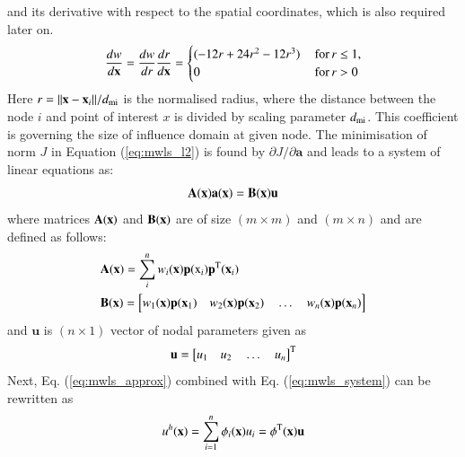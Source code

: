 \documentclass[11pt]{acmeArticle}
\numberwithin{equation}{section}
\begin{document}
and its derivative with respect to the spatial coordinates, which is also required later on.
\begin{equation}
\frac{dw}{d{\boldsymbol {\rm x}}}= \frac{dw}{dr}\frac{dr}{d{\boldsymbol {\rm x}}} =\begin{cases} (-12r +24r^2 -12 r^3) \,  & \mathrm{for} \, r \leq 1, \\ 0 & \mathrm{for} \, r > 0  \end{cases}
\end{equation}
Here $r = ||{\boldsymbol {\rm x}}-{\boldsymbol {\rm x}}_i||/d_{\rm {mi}} $ is the normalised radius, where the distance between the node $i$  and point of interest $x$ is divided by scaling parameter $d_{\rm {mi}}$. This coefficient is governing the size of influence domain at given node. 
The minimisation of norm $J$ in Equation (\ref{eq:mwls_l2}) is found by ${\partial J}/{\partial \mathbf a}$ and leads to a system of linear equations as:
\begin{equation}
\mathbf{ { A }} ({\boldsymbol {\rm x}}) \mathbf{ { a}} ({\boldsymbol {\rm x}}) = \mathbf{ { B }}({\boldsymbol {\rm x}}) \mathbf{ { u}}
\end{equation} \label{eq:mwls_system}
where matrices $\mathbf{ { A }}({\boldsymbol {\rm x}})$ and \textbf{$\mathbf{ { B}}({\boldsymbol {\rm x}})$} are of size $(m \times m )$ and $(m \times n )$ and are defined as follows:
\begin{equation} 
\begin{aligned}
& \mathbf{ { A }}({\boldsymbol {\rm x}}) = \sum_i^n w_i ({\boldsymbol {\rm x}})\mathbf{p} (\mathrm  x_i)\mathbf p^{\rm T} ({\boldsymbol {\rm x}}_i) \\
& \mathbf{ { B }}({\boldsymbol {\rm x}}) = \Big[   w_1({\boldsymbol {\rm x}}) \mathbf p ({\boldsymbol {\rm x}}_1) \quad w_2({\boldsymbol {\rm x}}) \mathbf p ({\boldsymbol {\rm x}}_2) \quad \dots \quad  w_n({\boldsymbol {\rm x}}) \mathbf p ({\boldsymbol {\rm x}}_n)  \Big]
\end{aligned}
\end{equation}
and $\mathbf u$ is $(n \times 1)$ vector of nodal parameters given as 
\begin{equation}
\mathbf u = \big[ u_1 \quad u_2 \quad \dots \quad u_n \big]^{\rm T}
\end{equation}
Next, Eq. (\ref{eq:mwls_approx}) combined with Eq. (\ref{eq:mwls_system}) can be rewritten as 
\begin{equation}
u^h({\boldsymbol {\rm x}} )=\sum^n_{i=1} \phi_i({\boldsymbol {\rm x}}) u_i = \mathbf \phi^{\rm T} ({\boldsymbol {\rm x}}) \mathbf u
\end{equation}
\end{document}
